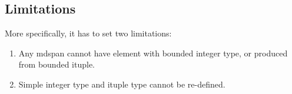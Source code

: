 \subsection*{Limitations}

More specifically, it has to set two limitations:

\begin{enumerate}[leftmargin=1.6em]
\item Any mdspan cannot have element with bounded integer type, or produced from bounded ituple.
\item Simple integer type and ituple type cannot be re-defined.
\end{enumerate}
